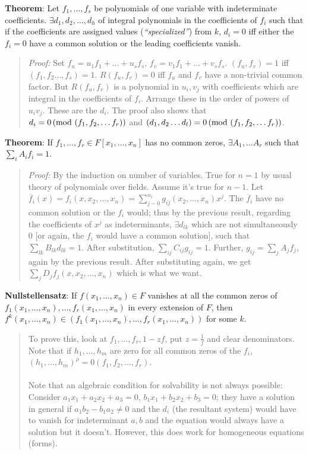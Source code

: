 {\bf Theorem}:
Let $f_{1},\ldots, f_{s}$ be polynomials of one variable with indeterminate
coefficients. $\exists d_{1} , d_{2}, \ldots, d_{h}$ of integral polynomials
in the coefficients of $f_i$ such that if the coefficients are assigned values 
(\emph{``specialized''})
from $k$, $d_{i}=0$ iff either
the $f_{i}=0$ have a common solution or the leading coefficients vanish.
\begin{quote}
\emph{Proof:} Set $f_{u} = u_{1} f_{1} + \ldots + u_{s} f_{s}$,
$f_{v} = v_{1} f_{1} + \ldots + v_{s} f_{s}$. $(f_{u}, f_{v})=1$ iff
$(f_{1}, f_{2} \ldots, f_{s}) = 1$.  $R(f_{u},f_{v}) = 0$ iff $f_u$ and
$f_v$ have a non-trivial common factor.  But $R(f_u, f_v)$ is
a polynomial in $u_{i}, v_{j}$ with coefficients which are integral in the
coefficients of $f_{i}$.  Arrange these in the order of powers of $u_i v_j$.
These are the $d_i$.
The proof also shows that 
$d_{i}= 0 \thinspace \textnormal{(mod } (f_{1}, f_{2}, \ldots f_{r}) \textnormal{)}$ and
$(d_{1}, d_{2} \ldots d_{l})= 0 \thinspace \textnormal{(mod } (f_{1}, f_{2}, \ldots f_{r}) \textnormal{)}$.
\end{quote}
{\bf Theorem}: If
$f_{1},\ldots, f_{r} \in F[x_1, \ldots, x_n]$ has no common zeros, 
$\exists A_{1},...A_{r}$ such that
$\sum_{i} A_{i}f_{i}=1$.
\begin{quote}
\emph{Proof:} By the induction on number of variables.  True for $n=1$
by usual theory of polynomials over fields.
Assume it's true for $n-1$.  Let ${\overline f}_i(x)= f_i(x, x_2, \ldots , x_n) =
\sum_{j-0}^{n_i} g_{ij}(x_2, \ldots, x_n) x^j$.  
The ${\overline f}_i$ have no common solution or the $f_i$ would; thus
by the previous result, regarding the coefficients of $x^j$ as indeterminants,
$\exists d_{lk}$ which are not simultaneously $0$ [or again, the $f_i$ would have a common
solution], such that 
$\sum_{lk} B_{lk} d_{lk} =1$.  After substitution,
$\sum_{ij} C_{ij} g_{ij} =1$.  Further, $g_{ij}= \sum_j A_j f_j$, again by
the previous result.  After substituting again, we get
$\sum_j D_j f_j(x, x_2, \ldots, x_n)$ which is what we want.
\end{quote}
{\bf Nullstellensatz}:  
If $f(x_1, \ldots, x_n) \in F$ vanishes at all the common zeros of
$f_1(x_1, \ldots, x_n), \ldots , f_r(x_1, \ldots, x_n)$
in every extension of $F$, then
$f^k(x_1, \ldots, x_n) \in (f_1(x_1, \ldots, x_n), \ldots,
f_r(x_1, \ldots, x_n))$ for some $k$.
\begin{quote}  
To prove this, look at
$f_{1},\ldots, f_{r}, 1-zf$,
put $z= {\frac {1} {f}}$ and clear denominators.
Note that if $h_1 , \ldots, h_m$ are zero
for all common zeros of the 
$f_i$, $(h_1, \ldots , h_m)^{\rho}= 0 (f_1 , f_2 , \ldots , f_r)$.
\\
\\
Note that an algebraic condition for solvability is not always
possible:  Consider
$a_1 x_1 +a_2 x_2 +a_3=0$,
$b_1 x_1 +b_2 x_2 +b_3=0$; they have a solution in general if
$a_1b_2-b_1a_2 \ne 0$ and the $d_i$ (the resultant system)
would have to vanish for indeterminant $a, b$ and the
equation would always have a solution but it doesn't.  However, this does work
for homogeneous equations (forms).
\end{quote}
